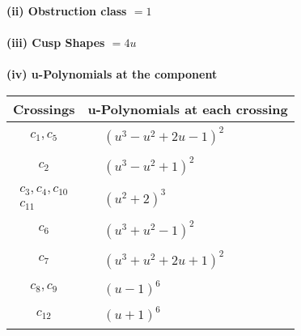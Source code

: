 \documentclass[1p]{elsarticle_modified}
\theoremstyle{definition}
\begin{document}
\flushleft \textbf{(ii) Obstruction class $= 1$}\\~\\
\flushleft \textbf{(iii) Cusp Shapes $= 4 u$}\\~\\
\newpage\renewcommand{\arraystretch}{1}
\flushleft \textbf{(iv) u-Polynomials at the component}\newline \\
\begin{tabular}{m{50pt}|m{274pt}}
Crossings & \hspace{64pt}u-Polynomials at each crossing \\
\hline $$\begin{aligned}c_{1},c_{5}\end{aligned}$$&$\begin{aligned}
&(u^3- u^2+2 u-1)^2
\end{aligned}$\\
\hline $$\begin{aligned}c_{2}\end{aligned}$$&$\begin{aligned}
&(u^3- u^2+1)^2
\end{aligned}$\\
\hline $$\begin{aligned}c_{3},c_{4},c_{10}\\c_{11}\end{aligned}$$&$\begin{aligned}
&(u^2+2)^3
\end{aligned}$\\
\hline $$\begin{aligned}c_{6}\end{aligned}$$&$\begin{aligned}
&(u^3+u^2-1)^2
\end{aligned}$\\
\hline $$\begin{aligned}c_{7}\end{aligned}$$&$\begin{aligned}
&(u^3+u^2+2 u+1)^2
\end{aligned}$\\
\hline $$\begin{aligned}c_{8},c_{9}\end{aligned}$$&$\begin{aligned}
&(u-1)^6
\end{aligned}$\\
\hline $$\begin{aligned}c_{12}\end{aligned}$$&$\begin{aligned}
&(u+1)^6
\end{aligned}$\\
\hline
\end{tabular}\\~\\
\end{document}
